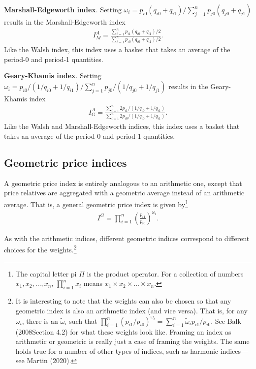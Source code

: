 \documentclass[
]{article}
\begin{document}
\textbf{Marshall-Edgeworth index}. Setting \(\omega_{i} = p_{i0} (q_{i0} + q_{i1}) / \sum_{j = 1}^{n} p_{j0} (q_{j0} + q_{j1})\) results in the Marshall-Edgeworth index
\begin{align*}
I^{A}_{M} = \frac{\sum_{i = 1}^{n} p_{i1} (q_{i0} + q_{i1}) / 2}{\sum_{i = 1}^{n} p_{i0} (q_{i0} + q_{i1}) / 2}.
\end{align*}
Like the Walsh index, this index uses a basket that takes an average of the period-0 and period-1 quantities.

\textbf{Geary-Khamis index}. Setting \(\omega_{i} = p_{i0} / (1 / q_{i0} + 1 / q_{i1}) / \sum_{j = 1}^{n} p_{j0} / (1 / q_{j0} + 1 / q_{j1})\) results in the Geary-Khamis index
\begin{align*}
I^{A}_{G} = \frac{\sum_{i = 1}^{n} 2 p_{i1} / (1 / q_{i0} + 1 / q_{i1})}{\sum_{i = 1}^{n} 2 p_{i0} / (1 / q_{i0} + 1 / q_{i1})}.
\end{align*}
Like the Walsh and Marshall-Edgeworth indices, this index uses a basket that takes an average of the period-0 and period-1 quantities.

\hypertarget{geometric-price-indices}{%
\subsection{Geometric price indices}\label{geometric-price-indices}}

A geometric price index is entirely analogous to an arithmetic one, except that price relatives are aggregated with a geometric average instead of an arithmetic average. That is, a general geometric price index is given by\footnote{The capital letter pi \(\Pi\) is the product operator. For a collection of numbers \(x_{1}, x_{2},\ldots,x_{n}\), \(\prod_{i=1}^{n} x_{i}\) means \(x_{1} \times x_{2} \times \ldots \times x_{n}\).}
\begin{align*}
I^{G} = \prod_{i = 1}^{n} \left(\frac{p_{i1}}{p_{i0}}\right)^{\omega_{i}}.
\end{align*}

As with the arithmetic indices, different geometric indices correspond to different choices for the weights.\footnote{It is interesting to note that the weights can also be chosen so that any geometric index is also an arithmetic index (and vice versa). That is, for any \(\omega_{i}\), there is an \(\tilde{\omega}_{i}\) such that \(\prod_{i = 1}^{n} (p_{i1} / p_{i0})^{\omega_{i}} = \sum_{i = 1}^{n} \tilde{\omega}_{i} p_{i1} / p_{i0}\). See Balk (2008Section 4.2) for what these weights look like. Framing an index as arithmetic or geometric is really just a case of framing the weights. The same holds true for a number of other types of indices, such as harmonic indices---see Martin (2020).}
\end{document}
